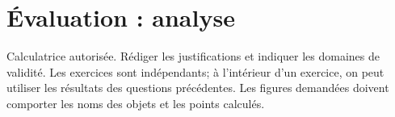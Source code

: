 \begingroup
\chapter*{Évaluation : analyse}
\renewcommand{\thebmtexo}{DS1.\arabic{bmtexo}}
\renewcommand{\theHbmtexo}{DS1.\arabic{bmtexo}}
\setcounter{bmtexo}{0}
\begin{devoir}
Calculatrice autorisée. Rédiger les justifications et indiquer les domaines de validité. Les exercices sont indépendants; à l’intérieur d’un exercice, on peut utiliser les résultats des questions précédentes. Les figures demandées doivent comporter les noms des objets et les points calculés.
\end{devoir}

